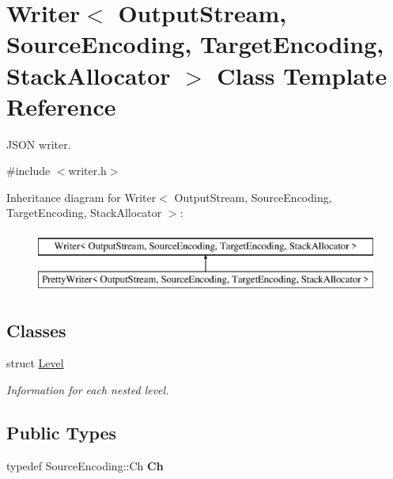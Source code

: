 \hypertarget{class_writer}{}\section{Writer$<$ Output\+Stream, Source\+Encoding, Target\+Encoding, Stack\+Allocator $>$ Class Template Reference}
\label{class_writer}


J\+S\+O\+N writer.  




{\ttfamily \#include $<$writer.\+h$>$}

Inheritance diagram for Writer$<$ Output\+Stream, Source\+Encoding, Target\+Encoding, Stack\+Allocator $>$\+:\begin{figure}[H]
\begin{center}
\leavevmode
\includegraphics[height=2.000000cm]{class_writer}
\end{center}
\end{figure}
\subsection*{Classes}
\begin{DoxyCompactItemize}
\item 
struct \hyperlink{struct_writer_1_1_level}{Level}
\begin{DoxyCompactList}\small\item\em Information for each nested level. \end{DoxyCompactList}\end{DoxyCompactItemize}
\subsection*{Public Types}
\begin{DoxyCompactItemize}
\item 
\hypertarget{class_writer_a5ba0d623162839460024b517fc2d5868}{}typedef Source\+Encoding\+::\+Ch {\bfseries Ch}\label{class_writer_a5ba0d623162839460024b517fc2d5868}

\end{DoxyCompactItemize}

